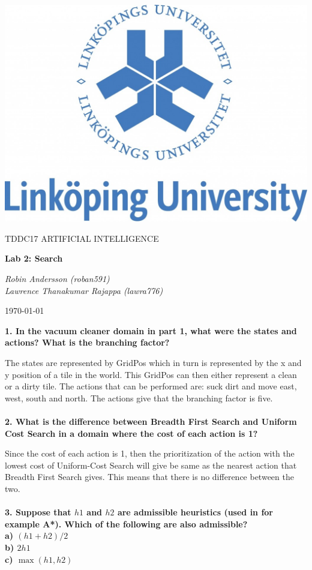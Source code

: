 \documentclass[a4paper,10pt]{article}
\begin{document}
\begin{titlepage}
	\centering
	\includegraphics[width=.6\textwidth]{liu-logo.png}\par
	\vfill
	{\scshape\Large TDDC17 ARTIFICIAL INTELLIGENCE\par}
	{\huge\bfseries Lab 2: Search\par}
	\vspace{1cm}
	{\large\itshape Robin Andersson (roban591) \\ Lawrence Thanakumar Rajappa (lawra776)\par}
	\vfill
	{\large \today\par}
\end{titlepage}

\textbf{1. In the vacuum cleaner domain in part 1, what were the states and actions? 
What is the branching factor?}

The states are represented by GridPos which in turn is represented by the x and y position of a tile in the world.
This GridPos can then either represent a clean or a dirty tile.
The actions that can be performed are: suck dirt and move east, west, south and north.
The actions give that the branching factor is five.
\\ \\
\textbf{2. What is the difference between Breadth First Search and Uniform Cost Search in a domain where the cost of each action is 1?}

Since the cost of each action is 1, then the prioritization of the action with the lowest cost of Uniform-Cost Search will
give be same as the nearest action that Breadth First Search gives.
This means that there is no difference between the two.
\\ \\
\textbf{3. Suppose that $h1$ and $h2$ are admissible heuristics (used in for example A*). Which of the following are also admissible?
\\ a) $(h1+h2)/2$
\\ b) $2h1$
\\ c) $\max(h1,h2)$}
\end{document}
